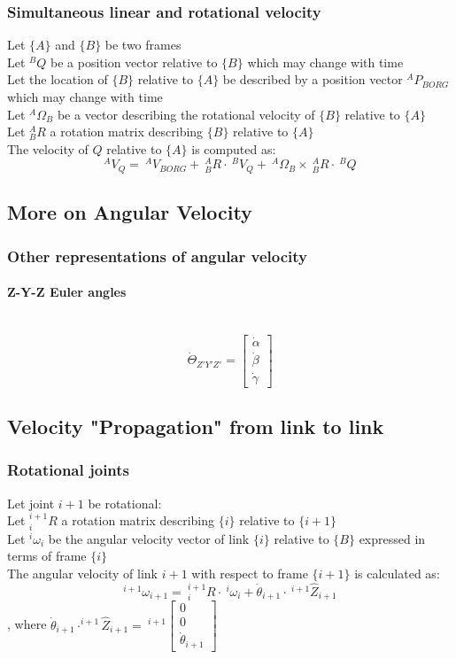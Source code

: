 \documentclass[10pt,a4paper]{article}
\newcommand{\vect}[1]{\ensuremath{\begin{bmatrix}#1\end{bmatrix}}}
\begin{document}
\subsubsection{Simultaneous linear and rotational velocity}
Let $\{A\}$ and $\{B\}$ be two frames \\
Let $^BQ$ be a position vector relative to $\{B\}$ which may change with time \\
Let the location of $\{B\}$ relative to $\{A\}$ be described by a position vector $^AP_{BORG}$ which may change with time \\
Let $^A\Omega_B$ be a vector describing the rotational velocity of $\{B\}$ relative to $\{A\}$ \\
Let $^A_BR$ a rotation matrix describing $\{B\}$ relative to $\{A\}$ \\
The velocity of $Q$ relative to $\{A\}$ is computed as: \\
$$
^AV_Q = ~^AV_{BORG} + ~^A_BR ⋅~^BV_Q + ~^A\Omega_B \times ~^A_BR ⋅ ~^BQ
$$

\subsection{More on Angular Velocity}
\subsubsection{Other representations of angular velocity}
\paragraph{Z-Y-Z Euler angles} ~\\
$$
	\dot \Theta_{Z'Y'Z'} = \vect{\dot \alpha \\ \dot \beta \\ \dot \gamma}
$$

\subsection{Velocity "Propagation" from link to link}
\subsubsection{Rotational joints}
Let joint $i+1$ be rotational: \\

Let $^{i+1}_iR$ a rotation matrix describing $\{i\}$ relative to $\{i+1\}$ \\
Let $^i\omega_i$ be the angular velocity vector of link $\{i\}$ relative to $\{B\}$ expressed in terms of frame $\{i\}$ \\
The angular velocity of link $i + 1$ with respect to frame $\{i + 1\}$ is calculated as:
$$
	^{i+1}\omega_{i+1} = ~^{i+1}_iR ⋅ ~^i\omega_i + \dot \theta_{i+1} ⋅ ~^{i+1}\hat{Z}_{i+1}
$$
, where $\dot \theta_{i+1} ⋅ ^{i+1}\hat{Z}_{i+1} = ~^{i+1}\vect{0 \\ 0 \\ \dot{\theta}_{i+1}}$ \\
\\
\end{document}
